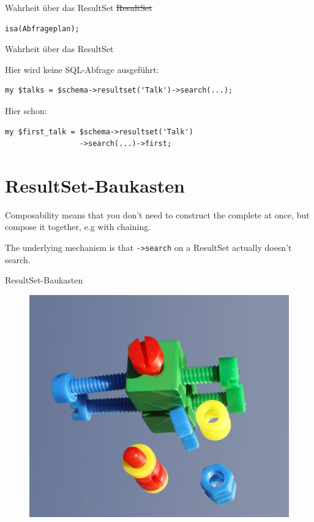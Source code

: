 \begin{frame}[fragile]{Wahrheit über das ResultSet}
\sout{ResultSet}

\begin{lstlisting}
isa(Abfrageplan);
\end{lstlisting}

\end{frame}

\begin{frame}[fragile]{Wahrheit über das ResultSet}

Hier wird keine SQL-Abfrage ausgeführt:

\begin{lstlisting}
my $talks = $schema->resultset('Talk')->search(...);
\end{lstlisting}

Hier schon:

\begin{lstlisting}
my $first_talk = $schema->resultset('Talk')
                 ->search(...)->first;
\end{lstlisting}

\end{frame}

\section{ResultSet-Baukasten}

Composability means that you don't need to construct the
complete at once, but compose it together, e.g with
chaining.

The underlying mechanism is that \verb|->search| on a
ResultSet actually doesn't search.


\begin{frame}{ResultSet-Baukasten}
\begin{figure}[!ht]
\centering
\includegraphics[width=0.70\linewidth]{img/baukasten.jpg}
\end{figure}
\end{frame}

